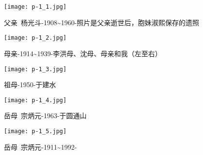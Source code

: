
\begin{figure}
    \begin{center}
        \texttt{[image: p-1\_1.jpg]}
        \begin{shaded}
            \caption{父亲~杨光斗-1908\textasciitilde{}1960-照片是父亲逝世后，胞妹淑熙保存的遗照}
        \end{shaded}
    \end{center}
\end{figure}

\clearpage


\begin{figure}
    \begin{center}
        \texttt{[image: p-1\_2.jpg]}
        \begin{shaded}
            \caption{母亲-1914\textasciitilde{}1939-李洪母、沈母、母亲和我（左至右）}
        \end{shaded}
    \end{center}
\end{figure}

\clearpage


\begin{figure}
    \begin{center}
        \texttt{[image: p-1\_3.jpg]}
        \begin{shaded}
            \caption{祖母-1950-于建水}
        \end{shaded}
    \end{center}
\end{figure}

\clearpage


\begin{figure}
    \begin{center}
        \texttt{[image: p-1\_4.jpg]}
        \begin{shaded}
            \caption{岳母~宗炳元-1963-于圆通山}
        \end{shaded}
    \end{center}
\end{figure}

\clearpage


\begin{figure}
    \begin{center}
        \texttt{[image: p-1\_5.jpg]}
        \begin{shaded}
            \caption{岳母~宗炳元-1911\textasciitilde{}1992-}
        \end{shaded}
    \end{center}
\end{figure}

